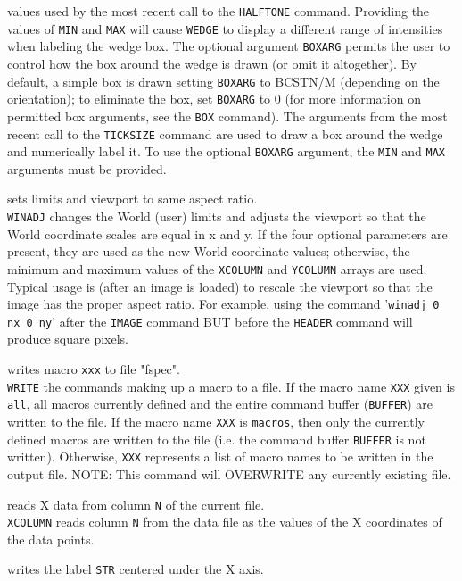 	values used by the most recent call to the
	{\tt HALFTONE} command.
	Providing the values of {\tt MIN} and {\tt MAX}
	will cause {\tt WEDGE} to display a different range
	of intensities when labeling the wedge box.  The optional
	argument {\tt BOXARG} permits the user to control how
	the box around the wedge is drawn (or omit it altogether).
	By default, a simple box is drawn setting {\tt BOXARG}
	to BCSTN/M (depending on the orientation); to eliminate the box,
	set {\tt BOXARG} to 0 (for more information on permitted
	box arguments, see the {\tt BOX} command).
	The arguments from the most recent call to the
	{\tt TICKSIZE} command are used
	to draw a box around the wedge and numerically label it.
	To use the optional {\tt BOXARG} argument, the
	{\tt MIN} and {\tt MAX} arguments must be provided.
\item [{\tt WINADJ [xmin xmax ymin ymax] } --] sets limits and viewport to same aspect ratio.\\
	{\tt WINADJ} changes the World (user) limits and
	adjusts the viewport so that the World coordinate scales are
	equal in x and y.  If the four optional parameters are present,
	they are used as the new World coordinate values; otherwise,
	the minimum and maximum values of the
	{\tt XCOLUMN} and
	{\tt YCOLUMN} arrays are used.
	Typical usage is (after an image is loaded) to rescale the
	viewport so that the image has the proper aspect ratio.
	For example, using the command '{\tt winadj 0 nx 0 ny}'
	after the {\tt IMAGE} command BUT
	before the {\tt HEADER} command
	will produce square pixels.
\item [{\tt WRITE fspec xxx } --] writes macro {\tt xxx} to file "fspec".\\
	{\tt WRITE} the commands making up a macro to a file.
	If the macro name {\tt XXX} given is {\tt all},
	all macros currently defined and the entire command buffer
	({\tt BUFFER}) are written to the
	file.  If the macro name {\tt XXX} is {\tt macros},
	then only the currently defined macros are written to the file
	(i.e. the command buffer {\tt BUFFER}
	is not written).  Otherwise, {\tt XXX} represents a list
	of macro names to be written in the output file.
	NOTE: This command will OVERWRITE any currently existing file.
\item [{\tt XCOLUMN N } --] reads X data from column {\tt N} of the current file.\\
	{\tt XCOLUMN} reads column {\tt N} from the
	data file as the values of the X coordinates of the data points.
\item [{\tt XLABEL str } --] writes the label {\tt STR} centered under the X axis.\\
